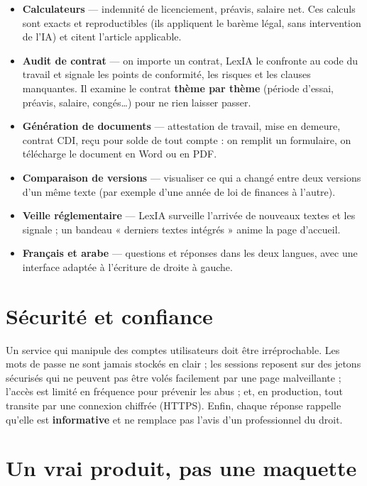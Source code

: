 \documentclass[11pt,a4paper]{article}
\begin{document}
\begin{itemize}[leftmargin=1.3em,itemsep=4pt]
  \item \textbf{Calculateurs} --- indemnité de licenciement, préavis, salaire net. Ces calculs sont
        exacts et reproductibles (ils appliquent le barème légal, sans intervention de l'IA) et citent
        l'article applicable.
  \item \textbf{Audit de contrat} --- on importe un contrat, LexIA le confronte au code du travail et
        signale les points de conformité, les risques et les clauses manquantes. Il examine le contrat
        \textbf{thème par thème} (période d'essai, préavis, salaire, congés…) pour ne rien laisser
        passer.
  \item \textbf{Génération de documents} --- attestation de travail, mise en demeure, contrat CDI,
        reçu pour solde de tout compte : on remplit un formulaire, on télécharge le document en Word ou
        en PDF.
  \item \textbf{Comparaison de versions} --- visualiser ce qui a changé entre deux versions d'un même
        texte (par exemple d'une année de loi de finances à l'autre).
  \item \textbf{Veille réglementaire} --- LexIA surveille l'arrivée de nouveaux textes et les signale ;
        un bandeau « derniers textes intégrés » anime la page d'accueil.
  \item \textbf{Français et arabe} --- questions et réponses dans les deux langues, avec une interface
        adaptée à l'écriture de droite à gauche.
\end{itemize}

\section{Sécurité et confiance}

Un service qui manipule des comptes utilisateurs doit être irréprochable. Les mots de passe ne sont
jamais stockés en clair ; les sessions reposent sur des jetons sécurisés qui ne peuvent pas être
volés facilement par une page malveillante ; l'accès est limité en fréquence pour prévenir les abus ;
et, en production, tout transite par une connexion chiffrée (HTTPS). Enfin, chaque réponse rappelle
qu'elle est \textbf{informative} et ne remplace pas l'avis d'un professionnel du droit.

\section{Un vrai produit, pas une maquette}
\end{document}
